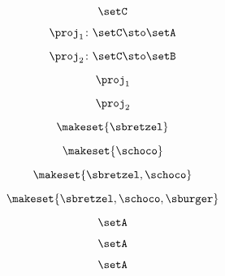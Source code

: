 \begin{forslides}
    \begin{equation}
        \label{eq:feedback-151}
        \setC
    \end{equation}

    \begin{equation}
        \label{eq:feedback-152}
        \proj_1\colon \setC \sto \setA
    \end{equation}

    \begin{equation}
        \label{eq:feedback-153}
        \proj_2\colon \setC \sto \setB
    \end{equation}

    \begin{equation}
        \label{eq:feedback-154}
        \proj_1
    \end{equation}

    \begin{equation}
        \label{eq:feedback-155}
        \proj_2
    \end{equation}

    \begin{equation}
        \label{eq:feedback-156}
        \makeset{ \sbretzel }
    \end{equation}

    \begin{equation}
        \label{eq:feedback-157}
        \makeset{ \schoco }
    \end{equation}

    \begin{equation}
        \label{eq:feedback-158}
        \makeset{ \sbretzel, \schoco }
    \end{equation}

    \begin{equation}
        \label{eq:feedback-159}
        \makeset{ \sbretzel, \schoco, \sburger }
    \end{equation}

    \begin{equation}
        \label{eq:feedback-160}
        \setA
    \end{equation}

    \begin{equation}
        \label{eq:feedback-161}
        \setA
    \end{equation}

    \begin{equation}
        \label{eq:feedback-162}
        \setA
    \end{equation}


\end{forslides}
